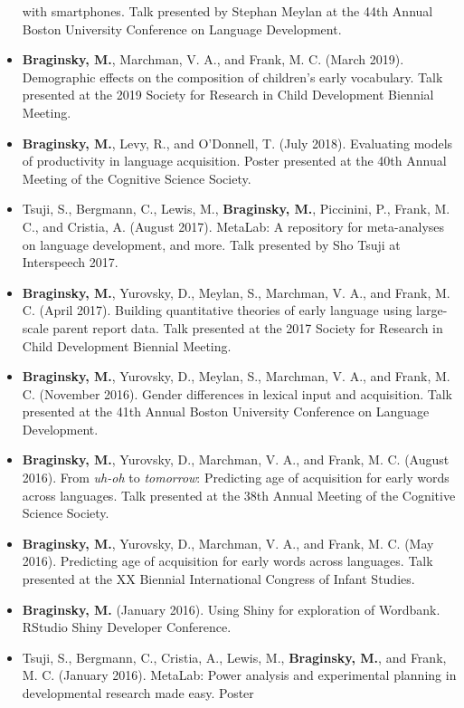 \documentclass[11pt,]{article}
\begin{document}
\begin{itemize}
  with smartphones. Talk presented by Stephan Meylan at the 44th Annual
  Boston University Conference on Language Development.
\item
  \textbf{Braginsky, M.}, Marchman, V. A., and Frank, M. C. (March
  2019). Demographic effects on the composition of children's early
  vocabulary. Talk presented at the 2019 Society for Research in Child
  Development Biennial Meeting.
\item
  \textbf{Braginsky, M.}, Levy, R., and O'Donnell, T. (July 2018).
  Evaluating models of productivity in language acquisition. Poster
  presented at the 40th Annual Meeting of the Cognitive Science Society.
\item
  Tsuji, S., Bergmann, C., Lewis, M., \textbf{Braginsky, M.}, Piccinini,
  P., Frank, M. C., and Cristia, A. (August 2017). MetaLab: A repository
  for meta-analyses on language development, and more. Talk presented by
  Sho Tsuji at Interspeech 2017.
\item
  \textbf{Braginsky, M.}, Yurovsky, D., Meylan, S., Marchman, V. A., and
  Frank, M. C. (April 2017). Building quantitative theories of early
  language using large-scale parent report data. Talk presented at the
  2017 Society for Research in Child Development Biennial Meeting.
\item
  \textbf{Braginsky, M.}, Yurovsky, D., Meylan, S., Marchman, V. A., and
  Frank, M. C. (November 2016). Gender differences in lexical input and
  acquisition. Talk presented at the 41th Annual Boston University
  Conference on Language Development.
\item
  \textbf{Braginsky, M.}, Yurovsky, D., Marchman, V. A., and Frank, M.
  C. (August 2016). From \emph{uh-oh} to \emph{tomorrow}: Predicting age
  of acquisition for early words across languages. Talk presented at the
  38th Annual Meeting of the Cognitive Science Society.
\item
  \textbf{Braginsky, M.}, Yurovsky, D., Marchman, V. A., and Frank, M.
  C. (May 2016). Predicting age of acquisition for early words across
  languages. Talk presented at the XX Biennial International Congress of
  Infant Studies.
\item
  \textbf{Braginsky, M.} (January 2016). Using Shiny for exploration of
  Wordbank. RStudio Shiny Developer Conference.
\item
  Tsuji, S., Bergmann, C., Cristia, A., Lewis, M., \textbf{Braginsky,
  M.}, and Frank, M. C. (January 2016). MetaLab: Power analysis and
  experimental planning in developmental research made easy. Poster

\end{itemize}
\end{document}
